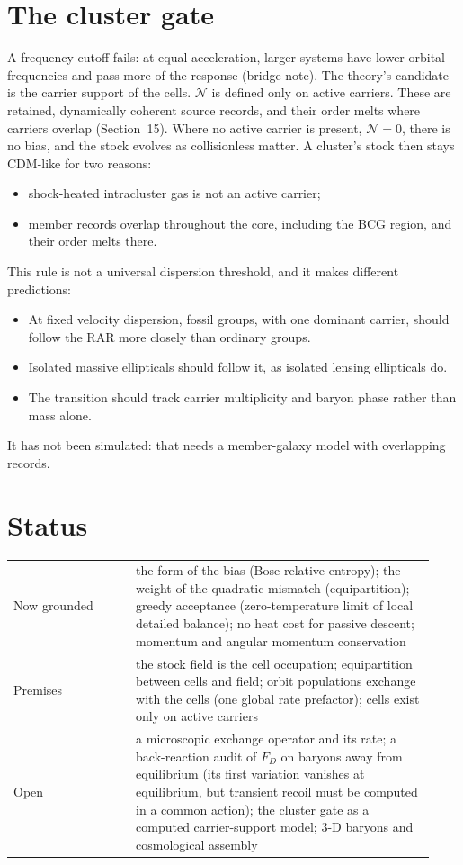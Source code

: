 \section{The cluster gate}
A frequency cutoff fails: at equal acceleration, larger systems have lower orbital frequencies and pass more of the response (bridge note). The theory's candidate is the carrier support of the cells. $\mathcal N$ is defined only on active carriers. These are retained, dynamically coherent source records, and their order melts where carriers overlap (Section~15). Where no active carrier is present, $\mathcal N=0$, there is no bias, and the stock evolves as collisionless matter. A cluster's stock then stays CDM-like for two reasons:
\begin{itemize}
\item shock-heated intracluster gas is not an active carrier;
\item member records overlap throughout the core, including the BCG region, and their order melts there.
\end{itemize}
This rule is not a universal dispersion threshold, and it makes different predictions:
\begin{itemize}
\item At fixed velocity dispersion, fossil groups, with one dominant carrier, should follow the RAR more closely than ordinary groups.
\item Isolated massive ellipticals should follow it, as isolated lensing ellipticals do.
\item The transition should track carrier multiplicity and baryon phase rather than mass alone.
\end{itemize}
It has not been simulated: that needs a member-galaxy model with overlapping records.

\section{Status}
\begin{center}\small
\begin{tabular}{p{0.27\linewidth}p{0.66\linewidth}}\toprule
Now grounded & the form of the bias (Bose relative entropy); the weight of the quadratic mismatch (equipartition); greedy acceptance (zero-temperature limit of local detailed balance); no heat cost for passive descent; momentum and angular momentum conservation\\
Premises & the stock field is the cell occupation; equipartition between cells and field; orbit populations exchange with the cells (one global rate prefactor); cells exist only on active carriers\\
Open & a microscopic exchange operator and its rate; a back-reaction audit of $F_D$ on baryons away from equilibrium (its first variation vanishes at equilibrium, but transient recoil must be computed in a common action); the cluster gate as a computed carrier-support model; 3-D baryons and cosmological assembly\\
\bottomrule\end{tabular}\end{center}

